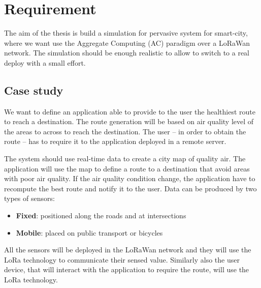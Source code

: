 \chapter{Requirement}

The aim of the thesis is build a simulation for pervasive system for smart-city, where we want use the Aggregate Computing (AC) paradigm over a LoRaWan network. The simulation should be enough realistic to allow to switch to a real deploy with a small effort.

\section{Case study}

We want to define an application able to provide to the user the healthiest route to reach a destination. The route generation will be based on air quality level of the areas to across to reach the destination. The user -- in order to obtain the route -- has to require it to the application deployed in a remote server.

The system should use real-time data to create a city map of quality air.
The application will use the map to define a route to a destination that avoid areas with poor air quality.
If the air quality condition change, the application have to recompute the best route and notify it to the user. 
Data can be produced by two types of sensors:
\begin{itemize}
    \item \textbf{Fixed}: positioned along the roads and at intersections
    \item \textbf{Mobile}: placed on public transport or bicycles
\end{itemize}

All the sensors will be deployed in the LoRaWan network and they will use the LoRa technology to communicate their sensed value. Similarly also the user device, that will interact with the application to require the route, will use the LoRa technology.